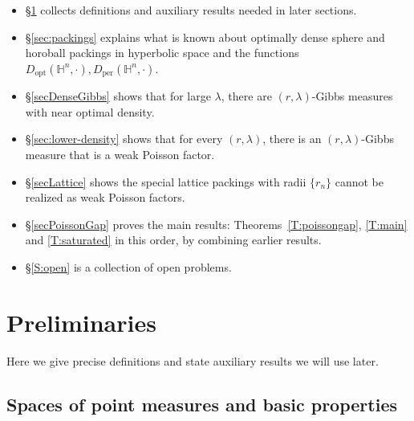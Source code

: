 \documentclass[11pt]{amsart}
\theoremstyle{definition}
\theoremstyle{remark}
\renewcommand{\H}{\mathbb{H}}
\newcommand{\opt}{\operatorname{opt}}
\newcommand{\per}{\operatorname{per}}
\newcommand{\lam}{\lambda}
\begin{document}
\begin{itemize}
   
    \item \S \ref{secPrelim} collects definitions and auxiliary results needed in later sections.

    \item \S \ref{sec:packings} explains what is known about optimally dense sphere and horoball packings in hyperbolic space and the functions $D_{\opt}(\H^n,\cdot), D_{\per}(\H^n,\cdot)$.
    
    \item \S \ref{secDenseGibbs} shows that for large $\lam$, there are $(r,\lam)$-Gibbs measures with near optimal density. 

    \item \S \ref{sec:lower-density} shows that for every $(r,\lam)$, there is an $(r,\lam)$-Gibbs measure that is a weak Poisson factor.

    
    \item \S \ref{secLattice} shows the special lattice packings with radii $\{r_n\}$ cannot be realized as weak Poisson factors.

\item \S \ref{secPoissonGap} proves the main results: Theorems~\ref{T:poissongap},  \ref{T:main} and \ref{T:saturated} in this order, by combining earlier results.


\item \S \ref{S:open} is a collection of open problems. 
\end{itemize}









\section{Preliminaries}
\label{secPrelim}

Here we give precise definitions and state auxiliary results we will use later.  

\subsection{Spaces of point measures and basic properties}
\end{document}

